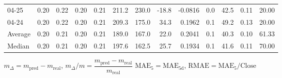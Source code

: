 \begin{threeparttable}
{\begin{tabular}{lrrrrrrrrrrrr}
  04-25 &          0.20 &          0.22 &          0.20 &        0.21 &               211.2 &               230.0 &      -18.8 &      -0.0816 &                 0.0 &             42.5 &            0.11 &                  20.00 \\
  04-24 &          0.20 &          0.22 &          0.20 &        0.21 &               209.3 &               175.0 &       34.3 &       0.1962 &                 0.1 &             49.2 &            0.13 &                  20.00 \\
Average &          0.20 &          0.21 &          0.20 &        0.21 &               189.0 &               167.0 &       22.0 &       0.2041 &                 0.1 &             40.3 &            0.10 &                  61.33 \\
 Median &          0.20 &          0.21 &          0.20 &        0.21 &               197.6 &               162.5 &       25.7 &       0.1934 &                 0.1 &             41.6 &            0.11 &                  70.00 \\
\bottomrule
\end{tabular}
}
\begin{tablenotes}\footnotesize
\item $m_\Delta=m_{\text{pred}}-m_{\text{real}}$,
$m_\Delta/m=\dfrac{m_{\text{pred}}-m_{\text{real}}}{m_{\text{real}}}$
$\mathrm{MAE}_5=\mathrm{MAE}_{5\text{d}}$,
$\mathrm{RMAE}=\mathrm{MAE}_5/\text{Close}$
\end{tablenotes}
\end{threeparttable}
\endgroup

